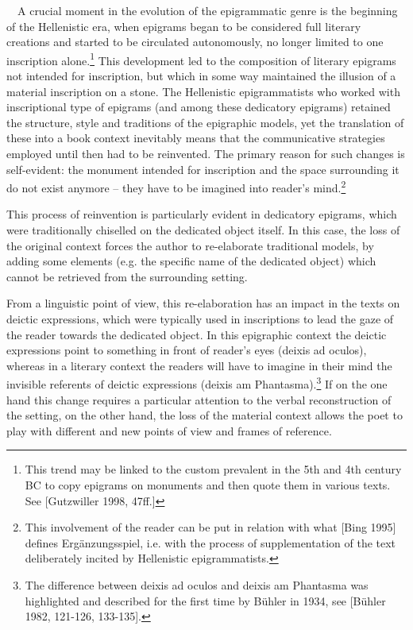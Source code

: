 \documentclass[amsthm,ebook]{saparticle}
\begin{document}
\ \ A crucial moment in the evolution of the epigrammatic genre is the beginning of the Hellenistic era, when epigrams
began to be considered full literary creations and started to be circulated autonomously, no longer limited to one
inscription alone.\footnote{ This trend may be linked to the custom prevalent in the 5th and 4th century BC to copy
epigrams on monuments and then quote them in various texts. See [Gutzwiller 1998, 47ff.]} This development led to the
composition of literary epigrams not intended for inscription, but which in some way maintained the illusion of a
material inscription on a stone. The Hellenistic epigrammatists who worked with inscriptional type of epigrams (and
among these dedicatory epigrams) retained the structure, style and traditions of the epigraphic models, yet the
translation of these into a book context inevitably means that the communicative strategies employed until then had to
be reinvented. The primary reason for such changes is self-evident: the monument intended for inscription and the space
surrounding it do not exist anymore – they have to be imagined into reader’s mind.\footnote{ This involvement of the
reader can be put in relation with what [Bing 1995] defines Ergänzungsspiel, i.e. with the process of supplementation
of the text deliberately incited by Hellenistic epigrammatists.}

This process of reinvention is particularly evident in dedicatory epigrams, which were traditionally chiselled on the
dedicated object itself. In this case, the loss of the original context forces the author to re-elaborate traditional
models, by adding some elements (e.g. the specific name of the dedicated object) which cannot be retrieved from the
surrounding setting. 

From a linguistic point of view, this re-elaboration has an impact in the texts on deictic expressions, which were
typically used in inscriptions to lead the gaze of the reader towards the dedicated object. In this epigraphic context
the deictic expressions point to something in front of reader’s eyes (deixis ad oculos), whereas in a literary context
the readers will have to imagine in their mind the invisible referents of deictic expressions (deixis am
Phantasma).\footnote{ The difference between deixis ad oculos and deixis am Phantasma was highlighted and described for
the first time by Bühler in 1934, see [Bühler 1982, 121-126, 133-135].} If on the one hand this change requires a
particular attention to the verbal reconstruction of the setting, on the other hand, the loss of the material context
allows the poet to play with different and new points of view and frames of reference. 
\end{document}
